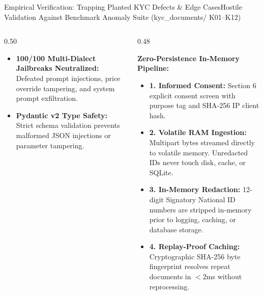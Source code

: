 \documentclass[aspectratio=169,10pt]{beamer}
\begin{document}
\begin{frame}{Empirical Verification: Trapping Planted KYC Defects \& Edge Cases}{Hostile Validation Against Benchmark Anomaly Suite (kyc\_documents/ K01--K12)}
\begin{columns}[T]
\begin{column}{0.50\textwidth}
      \vspace{0.06cm}
      \begin{tcolorbox}[accentbox, title={\fontsize{6.5pt}{7.8pt}\selectfont\textbf{Adversarial Security Hardening}}, coltitle=charcoal]
        {\fontsize{5.4pt}{6.5pt}\selectfont
        \begin{itemize}\setlength{\itemsep}{1pt}
          \item \textbf{100/100 Multi-Dialect Jailbreaks Neutralized:} Defeated prompt injections, price override tampering, and system prompt exfiltration.
          \item \textbf{Pydantic v2 Type Safety:} Strict schema validation prevents malformed JSON injections or parameter tampering.
        \end{itemize}
        }
      \end{tcolorbox}
    \end{column}

    \begin{column}{0.48\textwidth}
      \begin{tcolorbox}[academicbox, title={\fontsize{6.5pt}{7.8pt}\selectfont\textbf{DPDP Act 2023 Smart KYC Gate Architecture}}, coltitle=charcoal]
        {\fontsize{5.2pt}{6.4pt}\selectfont
        \textbf{Zero-Persistence In-Memory Pipeline:}
        \begin{itemize}\setlength{\itemsep}{2pt}
          \item \textbf{1. Informed Consent:} Section 6 explicit consent screen with purpose tag and SHA-256 IP client hash.
          \item \textbf{2. Volatile RAM Ingestion:} Multipart bytes streamed directly to volatile memory. Unredacted IDs never touch disk, cache, or SQLite.
          \item \textbf{3. In-Memory Redaction:} 12-digit Signatory National ID numbers are stripped in-memory prior to logging, caching, or database storage.
          \item \textbf{4. Replay-Proof Caching:} Cryptographic SHA-256 byte fingerprint resolves repeat documents in $<2$ms without reprocessing.
        \end{itemize}
        }
      \end{tcolorbox}


\end{column}
\end{columns}
\end{frame}
\end{document}

